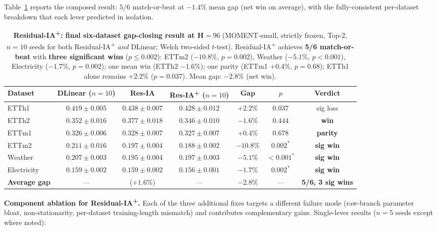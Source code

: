 \documentclass{article}
\begin{document}
Table~\ref{tab:residual_ia_plus} reports the composed result: $5/6$ match-or-beat at $-1.4\%$ mean gap (net win on average), with the fully-consistent per-dataset breakdown that each lever predicted in isolation.

\begin{table}[!htbp]
\centering
\caption{\textbf{Residual-IA\textsuperscript{+}: final six-dataset gap-closing result at H${=}96$} (MOMENT-small, strictly frozen, Top-2, $n{=}10$ seeds for both Residual-IA\textsuperscript{+} \emph{and} DLinear; Welch two-sided $t$-test). Residual-IA\textsuperscript{+} achieves \textbf{5/6 match-or-beat} with \textbf{three significant wins} ($p{\leq}0.002$): ETTm2 ($-10.8\%$, $p{=}0.002$), Weather ($-5.1\%$, $p{<}0.001$), Electricity ($-1.7\%$, $p{=}0.002$); one mean win (ETTh2 $-1.6\%$); one parity (ETTm1 $+0.4\%$, $p{=}0.68$); ETTh1 alone remains $+2.2\%$ ($p{=}0.037$). Mean gap: $\mathbf{-2.8\%}$ (net win).}
\label{tab:residual_ia_plus}
\footnotesize
\begin{tabular}{@{}lcccccc@{}}
\toprule
Dataset & DLinear ($n{=}10$) & Res-IA & Res-IA\textsuperscript{+} ($n{=}10$) & Gap & $p$ & Verdict \\
\midrule
ETTh1        & $0.419 \pm 0.005$ & $0.438 \pm 0.007$ & $0.428 \pm 0.012$ & $+2.2\%$  & $0.037$    & sig loss \\
ETTh2        & $0.352 \pm 0.016$ & $0.377 \pm 0.018$ & $\mathbf{0.346 \pm 0.010}$ & $-1.6\%$  & $0.444$    & \textbf{win} \\
ETTm1        & $0.326 \pm 0.006$ & $0.328 \pm 0.007$ & $0.327 \pm 0.007$ & $+0.4\%$  & $0.678$    & \textbf{parity} \\
ETTm2        & $0.211 \pm 0.016$ & $0.197 \pm 0.004$ & $\mathbf{0.188 \pm 0.002}$ & $-10.8\%$ & $0.002^{\ast}$ & \textbf{sig win} \\
Weather      & $0.207 \pm 0.003$ & $0.195 \pm 0.004$ & $\mathbf{0.197 \pm 0.003}$ & $-5.1\%$  & ${<}0.001^{\ast}$ & \textbf{sig win} \\
Electricity  & $0.159 \pm 0.002$ & $0.159 \pm 0.002$ & $\mathbf{0.156 \pm 0.001}$ & $-1.7\%$  & $0.002^{\ast}$ & \textbf{sig win} \\
\midrule
\textbf{Average gap} & --- & ($+1.6\%$) & --- & $\mathbf{-2.8\%}$ & --- & \textbf{5/6, 3 sig wins} \\
\bottomrule
\end{tabular}
\end{table}

\textbf{Component ablation for Residual-IA\textsuperscript{+}.} Each of the three additional fixes targets a different failure mode (raw-branch parameter bloat, non-stationarity, per-dataset training-length mismatch) and contributes complementary gains. Single-lever results ($n{=}5$ seeds except where noted):
\end{document}
